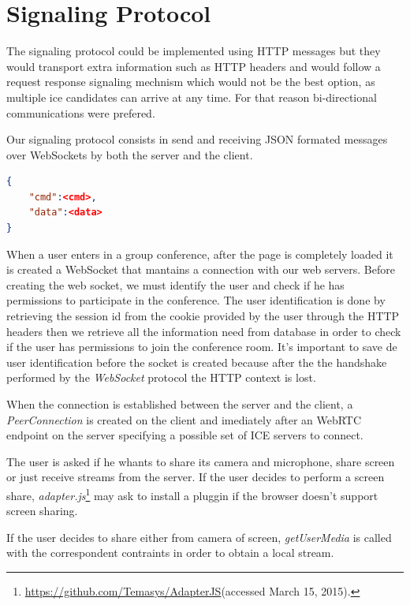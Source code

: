 \section{Signaling Protocol}

The signaling protocol could be implemented using \ac{HTTP} messages but they would transport extra information such as \ac{HTTP} headers and would follow a request response signaling mechnism which would not be the best option, as multiple ice candidates can arrive at any time. For that reason bi-directional communications were prefered.

Our signaling protocol consists in send and receiving JSON formated messages over WebSockets by both the server and the client. 

\begin{lstlisting}[caption={General structure of our WebSocket messages},language=json]
{
	"cmd":<cmd>,
	"data":<data>
}
\end{lstlisting}

When a user enters in a group conference, after the page is completely loaded it is created a WebSocket that mantains a connection with our web servers. 
Before creating the web socket, we must identify the user and check if he has permissions to participate in the conference. The user identification is done by retrieving the session id from the cookie provided by the user through the \ac{HTTP} headers then we retrieve all the information need from database in order to check if the user has permissions to join the conference room. It's important to save de user identification before the socket is created because after the the handshake performed by the \emph{WebSocket} protocol\cite{rfc6455} the \ac{HTTP} context is lost.

When the connection is established between the server and the client, a \emph{PeerConnection} is created on the client and imediately after an \ac{WebRTC} endpoint on the server specifying a possible set of \ac{ICE} servers to connect.

The user is asked if he whants to share its camera and microphone, share screen or just receive streams from the server. If the user decides to perform a screen share, \emph{adapter.js}\footnote{\url{https://github.com/Temasys/AdapterJS}(accessed March 15, 2015).} may ask to install a pluggin if the browser doesn't support screen sharing.

If the user decides to share either from camera of screen, \emph{getUserMedia} is called with the correspondent contraints in order to obtain a local stream. 

